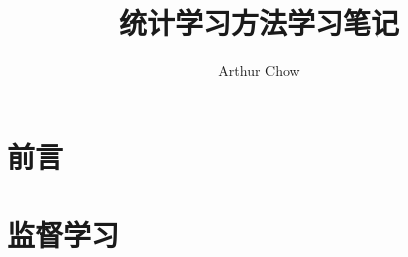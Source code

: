 \documentclass{book}
\title{统计学习方法学习笔记}
\author{Arthur Chow}
\date{}
\begin{document}
\frontmatter
\maketitle
\tableofcontents
\clearpage
\thispagestyle{empty}

\part*{前言}
%

\mainmatter
\part{监督学习}
%
%
%

%

\backmatter
\appendix
%
\end{document}
